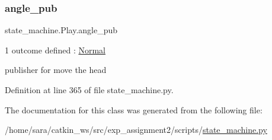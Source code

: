 \subsubsection{\texorpdfstring{angle\+\_\+pub}{angle\_pub}}
{\footnotesize\ttfamily state\+\_\+machine.\+Play.\+angle\+\_\+pub}



1 outcome defined \+: \hyperlink{classstate__machine_1_1Normal}{Normal} 

publisher for move the head 

Definition at line 365 of file state\+\_\+machine.\+py.



The documentation for this class was generated from the following file\+:\begin{DoxyCompactItemize}
\item 
/home/sara/catkin\+\_\+ws/src/exp\+\_\+assignment2/scripts/\hyperlink{state__machine_8py}{state\+\_\+machine.\+py}\end{DoxyCompactItemize}
